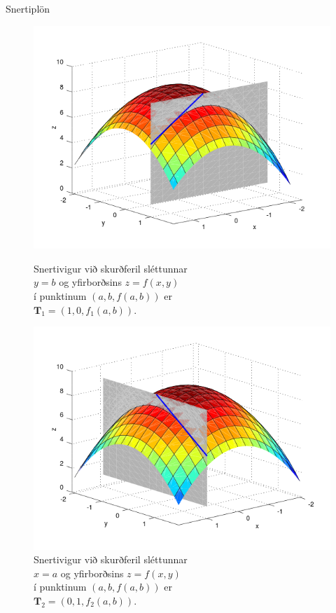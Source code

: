 \begin {frame}{Snertiplön}
 \begin{figure}[!h]
        \centering
        \begin{minipage}{.5\textwidth}
            \centering
            \includegraphics[width=1\linewidth]{xpart.png}
            \caption*{Snertivigur við skurðferil sléttunnar \\ $y=b$ og yfirborðsins $z = f(x,y)$ \\ í punktinum $(a,b,f(a,b))$ er \\ $\mathbf{T}_1 = (1,0,f_1(a,b))$.}
        \end{minipage}%
        \begin{minipage}{.5\textwidth}
            \centering
            \includegraphics[width=1\linewidth]{ypart.png}
            \caption*{Snertivigur við skurðferil sléttunnar \\ $x=a$ og yfirborðsins $z = f(x,y)$ \\ í punktinum $(a,b,f(a,b))$ er \\ $\mathbf{T}_2 = (0,1,f_2(a,b))$.}
        \end{minipage}
    \end{figure}
 
\end {frame}



